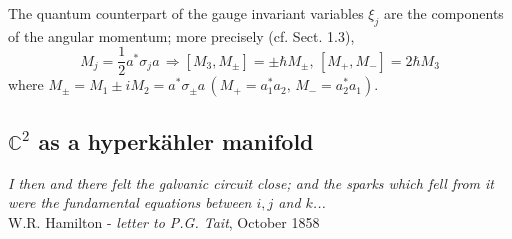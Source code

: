 \documentclass[12pt]{article}
\begin{document}
The quantum counterpart of the gauge invariant variables $\xi_j$ are the components of 
the angular momentum; more precisely (cf. Sect. 1.3),
\begin{equation}
\label{Mj}
M_j = \frac{1}{2}a^*\sigma_j a \, \Rightarrow [M_3, M_\pm] = \pm \hbar M_\pm, \, [M_+, M_-] = 2\hbar M_3 
\end{equation}
where $M_\pm = M_1 \pm iM_2 = a^*\sigma_\pm a \, (M_+ = a_1^* a_2, \, M_- = a_2^* a_1)$.

\smallskip
 
\subsection{${\mathbb C}^2$ as a hyperk\"{a}hler manifold}

\begin{flushright}
{\it I then and there felt the galvanic circuit close; and the sparks which fell
 from it were the fundamental equations between $i, j$ and $k$...}  \\
                        W.R. Hamilton - {\it letter to P.G. Tait}, October 1858
\end{flushright} 
              
\smallskip
\end{document}
